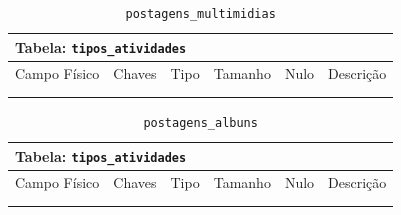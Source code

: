 \documentclass[12pt,a4paper]{article}
\begin{document}
\begin{center}
\begin{table}[h!]
	\caption{\texttt{postagens\_multimidias}}
	\label{tabela:postagensMultimidias}
	\begin{tabular}{|p{2.5cm}|p{1cm}|p{1.25cm}|p{1.75cm}|p{1.25cm}|p{5cm}|}\hline	
		\multicolumn{6}{|p{16cm}|}{\cellcolor{cinzaClaro}  \centering Tabela: \texttt{tipos\_atividades}} \\ \hline %
		{\small Campo Físico}   & {\small Chaves} & {\small Tipo} & {\small Tamanho} & {\small Nulo} & {\small Descrição}\\\hline %
		
		{\tiny } & {\tiny } & {\tiny } & {\tiny } & {\tiny } &{\tiny }\\\hline
		{\tiny } & {\tiny } & {\tiny } & {\tiny } & {\tiny } &{\tiny }\\\hline
	
			
	\end{tabular}
\end{table}	
\end{center}

\begin{center}
\begin{table}[h!]
	\caption{\texttt{postagens\_albuns}}
	\label{tabela:postagensAlbuns}
	\begin{tabular}{|p{2.5cm}|p{1cm}|p{1.25cm}|p{1.75cm}|p{1.25cm}|p{5cm}|}\hline	
		\multicolumn{6}{|p{16cm}|}{\cellcolor{cinzaClaro}  \centering Tabela: \texttt{tipos\_atividades}} \\ \hline %
		{\small Campo Físico}   & {\small Chaves} & {\small Tipo} & {\small Tamanho} & {\small Nulo} & {\small Descrição}\\\hline %
		
		{\tiny } & {\tiny } & {\tiny } & {\tiny } & {\tiny } &{\tiny }\\\hline
		{\tiny } & {\tiny } & {\tiny } & {\tiny } & {\tiny } &{\tiny }\\\hline
			
	\end{tabular}
\end{table}	
\end{center}
\end{document}
